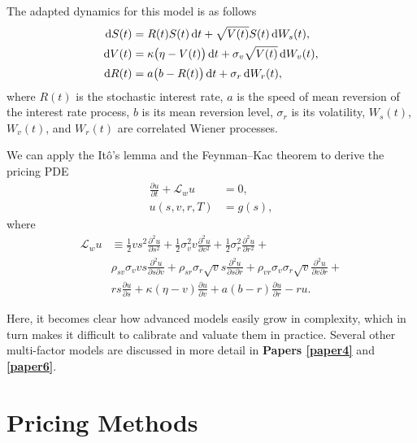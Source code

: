 \documentclass{UUThesisTemplate}
\begin{document}
\par
The adapted dynamics for this model is as follows
\begin{align}
\dif S(t) & =  R(t)S(t)\dif t + \sqrt{V(t)}S(t)\dif W_s(t), \label{hhwSDE1} \\
\dif V(t) & =  \kappa\big(\eta-V(t)\big)\dif t + \sigma_v \sqrt{V(t)}\dif W_v(t), \label{hhwSDE2} \\
\dif R(t) & = a\big(b-R(t)\big)\dif t + \sigma_r\dif W_r(t), {\color{white} \sqrt{V(t)}} \label{hhwSDE3}
\end{align}
where $R(t)$ is the stochastic interest rate, $a$ is the speed of mean reversion of the interest rate process, $b$ is its mean reversion level, $\sigma_r$ is its volatility,  $W_s(t)$, $W_v(t)$,  and $W_r(t)$ are correlated Wiener processes.

\par
We can apply the It\^{o}'s lemma and the Feynman--Kac theorem to derive the pricing PDE
\begin{align}
\frac{\partial u}{\partial t}+\mathcal{L}_w u&=0, \nonumber \\
u(s,v,r,T) &= g(s), \label{hhwPDE}
\end{align}
where
\begin{align}
\mathcal{L}_{w} u &\equiv  \frac{1}{2}vs^2\frac{\partial^2 u}{\partial s^2} + \frac{1}{2}\sigma_v^2v\frac{\partial^2 u}{\partial v^2}  + \frac{1}{2}\sigma_r^2\frac{\partial^2 u}{\partial r^2} + \nonumber \\
                             & \rho_{sv}\sigma_v vs\frac{\partial^2 u}{\partial s\partial v} + \rho_{sr}\sigma_r \sqrt{v} s\frac{\partial^2 u}{\partial s\partial r} + \rho_{vr}\sigma_v\sigma_r \sqrt{v}\frac{\partial^2 u}{\partial v\partial r} + \nonumber \\
                             & rs\frac{\partial u}{\partial s} + \kappa(\eta-v)\frac{\partial u}{\partial v} + a(b-r)\frac{\partial u}{\partial r} - ru. \label{eqHHWop}
\end{align}

\par
Here, it becomes clear how advanced models easily grow in complexity, which in turn makes it difficult to calibrate and valuate them in practice. Several other multi-factor models are discussed in more detail in \textbf{Papers \ref{paper4}} and \textbf{\ref{paper6}}. 
%





%
\section{Pricing Methods}
\label{sec:methods}
\end{document}
